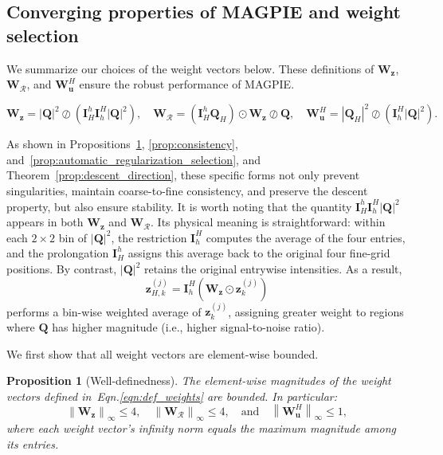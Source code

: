 \documentclass{article}
\numberwithin{equation}{section}
\newtheorem{proposition}[theorem]{Proposition}
\begin{document}
\subsection{Converging properties of MAGPIE and weight selection}\label{sec:weights_property}

We summarize our choices of the weight vectors below. These definitions of $\bm{W}_{\bm{z}}$, $\bm{W}_{\mathcal{R}}$, and $\bm{W}_{\bm{u}}^H$ ensure the robust performance of MAGPIE.

\begin{equation}\label{eqn:def_weights}
    \bm{W}_{\bm{z}} = |\bm{Q}|^2\oslash\left(\bm{I}_H^h\bm{I}_h^H|\bm{Q}|^2\right),\quad
    \bm{W}_{\mathcal{R}} = (\bm{I}_H^h\bm{Q}_H)\odot\bm{W}_{\bm{z}}\oslash\bm{Q},\quad
    \bm{W}_{\bm{u}}^H = |\bm{Q}_H|^2\oslash\left(\bm{I}_h^H|\bm{Q}|^2\right).
\end{equation}

As shown in Propositions~\ref{prop:weights_property}, \ref{prop:consistency}, and~\ref{prop:automatic_regularization_selection}, and Theorem~\ref{prop:descent_direction}, these specific forms not only prevent singularities, maintain coarse-to-fine consistency, and preserve the descent property, but also ensure stability. It is worth noting that the quantity $\bm{I}_H^h\bm{I}_h^H|\bm{Q}|^2$
appears in both $\bm{W}_{\bm{z}}$ and $\bm{W}_{\mathcal{R}}$.
Its physical meaning is straightforward: within each $2\times 2$ bin of
$|\bm{Q}|^2$, the restriction $\bm{I}_h^H$ computes the average of the
four entries, and the prolongation $\bm{I}_H^h$ assigns this average back
to the original four fine-grid positions. By contrast, $|\bm{Q}|^2$
retains the original entrywise intensities. As a result,
\begin{equation*}
    \bm{z}_{H,k}^{(j)} = \bm{I}_h^H\left(\bm{W}_{\bm{z}}\odot\bm{z}_k^{(j)}\right)
\end{equation*} 
performs a bin-wise weighted average of $\bm{z}_k^{(j)}$, assigning greater weight to regions where $\bm{Q}$ has higher magnitude (i.e., higher signal-to-noise ratio). 

We first show that all weight vectors are element-wise bounded. 
\begin{proposition}[Well-definedness]\label{prop:weights_property}
{The element-wise magnitudes of the weight vectors defined in~Eqn.\eqref{eqn:def_weights} are bounded.} In particular:
\begin{equation*}
\left\|\bm{W}_{\bm{z}}\right\|_{\infty} \leq 4,\quad \left\|\bm{W}_{\mathcal{R}}\right\|_{\infty} \leq 4,\quad\text{and}\quad \left\|\bm{W}_{\bm{u}}^H\right\|_{\infty} \leq 1,
\end{equation*}
{where each weight vector's infinity norm equals the maximum magnitude among its entries.}
\end{proposition}
\end{document}
